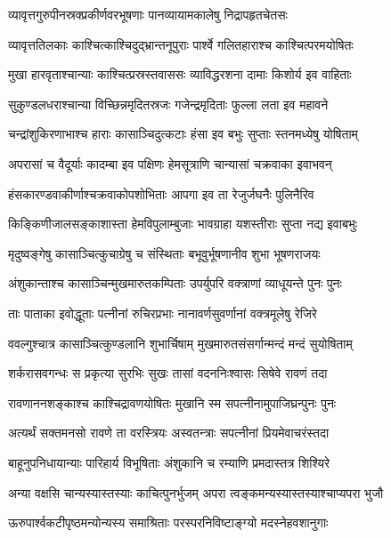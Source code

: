 \twolineshloka
{व्यावृत्तगुरुपीनस्रक्प्रकीर्णवरभूषणाः}
{पानव्यायामकालेषु निद्रापहृतचेतसः} %

\twolineshloka
{व्यावृत्ततिलकाः काश्चित्काश्चिदुद्भ्रान्तनूपुराः}
{पार्श्वे गलितहाराश्च काश्चित्परमयोषितः} %

\twolineshloka
{मुखा हारवृताश्चान्याः काश्चित्प्रस्रस्तवाससः}
{व्याविद्धरशना दामाः किशोर्य इव वाहिताः} %

\twolineshloka
{सुकुण्डलधराश्चान्या विच्छिन्नमृदितस्रजः}
{गजेन्द्रमृदिताः फुल्ला लता इव महावने} %

\twolineshloka
{चन्द्रांशुकिरणाभाश्च हाराः कासाञ्चिदुत्कटाः}
{हंसा इव बभुः सुप्ताः स्तनमध्येषु योषिताम्} %

\twolineshloka
{अपरासां च वैदूर्याः कादम्बा इव पक्षिणः}
{हेमसूत्राणि चान्यासां चक्रवाका इवाभवन्} %

\twolineshloka
{हंसकारण्डवाकीर्णाश्चक्रवाकोपशोभिताः}
{आपगा इव ता रेजुर्जघनैः पुलिनैरिव} %

\twolineshloka
{किङ्किणीजालसङ्काशास्ता हेमविपुलाम्बुजाः}
{भावग्राहा यशस्तीराः सुप्ता नद्य इवाबभुः} %

\twolineshloka
{मृदुष्वङ्गेषु कासाञ्चित्कुचाग्रेषु च संस्थिताः}
{बभूवुर्भूषणानीव शुभा भूषणराजयः} %

\twolineshloka
{अंशुकान्ताश्च कासाञ्चिन्मुखमारुतकम्पिताः}
{उपर्युपरि वक्त्राणां व्याधूयन्ते पुनः पुनः} %

\twolineshloka
{ताः पाताका इवोद्धूताः पत्नीनां रुचिरप्रभाः}
{नानावर्णसुवर्णानां वक्त्रमूलेषु रेजिरे} %

\twolineshloka
{ववल्गुश्चात्र कासाञ्चित्कुण्डलानि शुभार्चिषाम्}
{मुखमारुतसंसर्गान्मन्दं मन्दं सुयोषिताम्} %

\twolineshloka
{शर्करासवगन्धः स प्रकृत्या सुरभिः सुखः}
{तासां वदननिःश्वासः सिषेवे रावणं तदा} %

\twolineshloka
{रावणाननशङ्काश्च काश्चिद्रावणयोषितः}
{मुखानि स्म सपत्नीनामुपाजिघ्रन्पुनः पुनः} %

\twolineshloka
{अत्यर्थं सक्तमनसो रावणे ता वरस्त्रियः}
{अस्वतन्त्राः सपत्नीनां प्रियमेवाचरंस्तदा} %

\twolineshloka
{बाहूनुपनिधायान्याः पारिहार्य विभूषिताः}
{अंशुकानि च रम्याणि प्रमदास्तत्र शिश्यिरे} %

\twolineshloka
{अन्या वक्षसि चान्यस्यास्तस्याः काचित्पुनर्भुजम्}
{अपरा त्वङ्कमन्यस्यास्तस्याश्चाप्यपरा भुजौ} %

\twolineshloka
{ऊरुपार्श्वकटीपृष्ठमन्योन्यस्य समाश्रिताः}
{परस्परनिविष्टाङ्ग्यो मदस्नेहवशानुगाः} %

